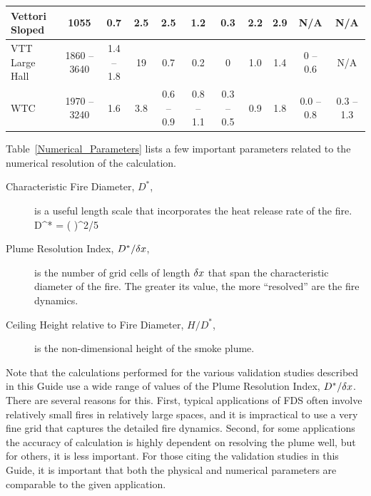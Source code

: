 \begin{landscape}
\begin{longtable}{|l|c|c|c|c|c|c|c|c|c|c|}
Vettori Sloped      & 1055          & 0.7           & 2.5   & 2.5               & 1.2                 & 0.3           & 2.2         & 2.9         & N/A                   & N/A                   \\ \hline
VTT Large Hall      & 1860 -- 3640  & 1.4 -- 1.8    & 19    & 0.7               & 0.2                 & 0             & 1.0         & 1.4         & 0 -- 0.6              & N/A                   \\ \hline
WTC                 & 1970 -- 3240  & 1.6           & 3.8   & 0.6 -- 0.9        & 0.8 -- 1.1          & 0.3 -- 0.5    & 0.9         & 1.8         & 0.0 -- 0.8            & 0.3 -- 1.3            \\ \hline
\end{longtable}
\end{landscape}


\FloatBarrier

Table~\ref{Numerical_Parameters} lists a few important parameters related to the numerical resolution of the calculation.
\begin{description}
\item[Characteristic Fire Diameter, $D^*$,] is a useful length scale that incorporates the heat release rate of the fire.
\be D^* = \left(  \right)^{2/5}  \ee
\item[Plume Resolution Index, $D^*/\delta x$,] is the number of grid cells of length $\delta x$ that span the characteristic diameter of the fire. The greater its value, the more ``resolved'' are the fire dynamics.
\item[Ceiling Height relative to Fire Diameter, $H/D^*$,] is the non-dimensional height of the smoke plume.
\end{description}
Note that the calculations performed for the various validation studies described in this Guide use a wide range of values of the Plume Resolution Index, $D^*/\delta x$. There are several reasons for this. First, typical applications of FDS often involve relatively small fires in relatively large spaces, and it is impractical to use a very fine grid that captures the detailed fire dynamics. Second, for some applications the accuracy of calculation is highly dependent on resolving the plume well, but for others, it is less important. For those citing the validation studies in this Guide, it is important that both the physical and numerical parameters are comparable to the given application.

\newpage

